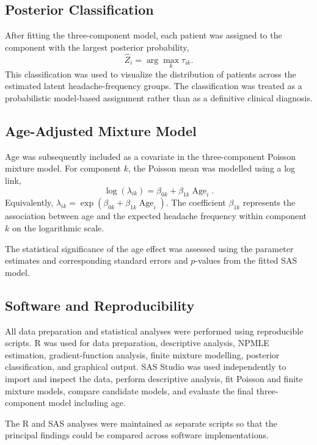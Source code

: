 \subsection{Posterior Classification}

After fitting the three-component model, each patient was assigned to the component with the largest posterior probability,
\[
\widehat{Z}_i=\arg\max_k\tau_{ik}.
\]
This classification was used to visualize the distribution of patients across the estimated latent headache-frequency groups. The classification was treated as a probabilistic model-based assignment rather than as a definitive clinical diagnosis.

\subsection{Age-Adjusted Mixture Model}

Age was subsequently included as a covariate in the three-component Poisson mixture model. For component $k$, the Poisson mean was modelled using a log link,
\[
\log(\lambda_{ik})=\beta_{0k}+\beta_{1k}\operatorname{Age}_i.
\]
Equivalently, $\lambda_{ik}=\exp(\beta_{0k}+\beta_{1k}\operatorname{Age}_i)$. The coefficient $\beta_{1k}$ represents the association between age and the expected headache frequency within component $k$ on the logarithmic scale.

The statistical significance of the age effect was assessed using the parameter estimates and corresponding standard errors and $p$-values from the fitted SAS model.

\subsection{Software and Reproducibility}

All data preparation and statistical analyses were performed using reproducible scripts. R was used for data preparation, descriptive analysis, NPMLE estimation, gradient-function analysis, finite mixture modelling, posterior classification, and graphical output. SAS Studio was used independently to import and inspect the data, perform descriptive analysis, fit Poisson and finite mixture models, compare candidate models, and evaluate the final three-component model including age.

The R and SAS analyses were maintained as separate scripts so that the principal findings could be compared across software implementations.
